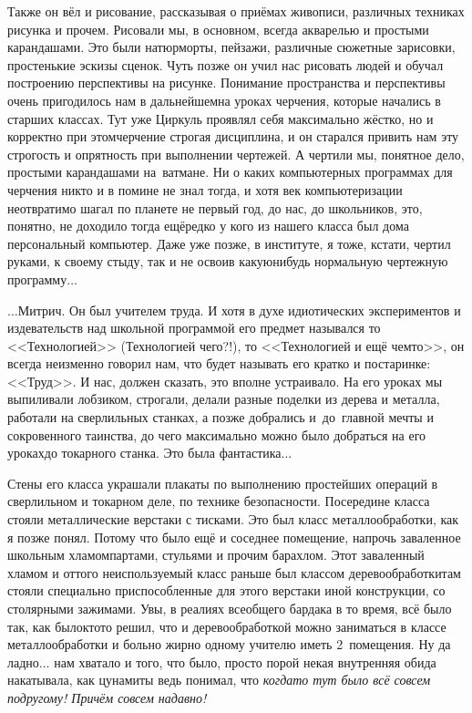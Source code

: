 Также он вёл и рисование, рассказывая о приёмах живописи, различных техниках рисунка и прочем. Рисовали мы, в основном, всегда акварелью и простыми карандашами. Это были натюрморты, пейзажи, различные сюжетные зарисовки, простенькие эскизы сценок. Чуть позже он учил нас рисовать людей и обучал построению перспективы на рисунке. Понимание пространства и перспективы очень пригодилось нам в дальнейшем\mdash на уроках черчения, которые начались в старших классах. Тут уже Циркуль проявлял себя максимально жёстко, но и корректно при этом\mdash черчение строгая дисциплина, и он старался привить нам эту строгость и опрятность при выполнении чертежей. А чертили мы, понятное дело, простыми карандашами на~ватмане. Ни о каких компьютерных программах для черчения никто и в помине не знал тогда, и хотя век компьютеризации неотвратимо шагал по планете не первый год, до нас, до школьников, это, понятно, не доходило тогда ещё\mdash редко у кого из нашего класса был дома персональный компьютер. Даже уже позже, в институте, я тоже, кстати, чертил руками, к своему стыду, так и не освоив какую\sdash нибудь нормальную чертежную программу$\ldots$

\vspace{1.0cm}
$\ldots$Митрич. Он был учителем труда. И хотя в духе идиотических экспериментов и издевательств над школьной программой его предмет назывался то <<Технологией>> (Технологией чего?!), то <<Технологией и ещё чем\sdash то>>, он всегда неизменно говорил нам, что будет называть его кратко и по\sdash старинке: <<Труд>>. И нас, должен сказать, это вполне устраивало. На его уроках мы выпиливали лобзиком, строгали, делали разные поделки из дерева и металла, работали на сверлильных станках, а позже добрались и~до~главной мечты и сокровенного таинства, до чего максимально можно было добраться на его уроках\mdash до токарного станка. Это была фантастика$\ldots$

Стены его класса украшали плакаты по выполнению простейших операций в сверлильном и токарном деле, по технике безопасности. Посередине класса стояли металлические верстаки с тисками. Это был класс металлообработки, как я позже понял. Потому что было ещё и соседнее помещение, напрочь заваленное школьным хламом\mdash партами, стульями и прочим барахлом. Этот заваленный хламом и оттого неиспользуемый класс раньше был классом деревообработки\mdash там стояли специально приспособленные для этого верстаки иной конструкции, со столярными зажимами. Увы, в реалиях всеобщего бардака в то время, всё было так, как было\mdash кто\sdash то решил, что и деревообработкой можно заниматься в классе металлообработки и больно жирно одному учителю иметь 2~помещения. Ну да ладно$\ldots$ нам хватало и того, что было, просто порой некая внутренняя обида накатывала, как цунами\mdash ты ведь понимал, что \textit{когда\sdash то тут было всё совсем по\sdash другому! Причём совсем надавно!} 

